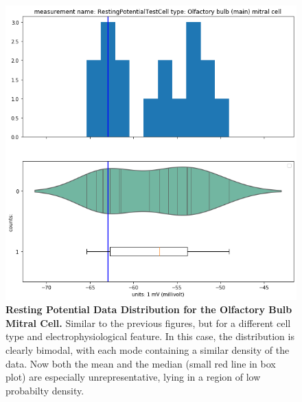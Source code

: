 \begin{figure}  
\begin{center}     
  \includegraphics[scale=0.8]{chapters/notebooks_converted/needata_thesis_files/needata_thesis_5_22}
      \caption[Bi-modal Distribution for Resting Membrane Potential from Mitral Cells]{\textbf{Resting Potential Data Distribution for the Olfactory Bulb Mitral Cell.} Similar to the previous figures, but for a different cell type and electrophysiological feature.
      In this case, the distribution is clearly bimodal, with each mode containing a similar density of the data.
      Now both the mean and the median (small red line in box plot) are especially unrepresentative, lying in a region of low probabilty density.
      }
      \label{fig:bimodal-feature}
\end{center}     
\end{figure}
%
    
